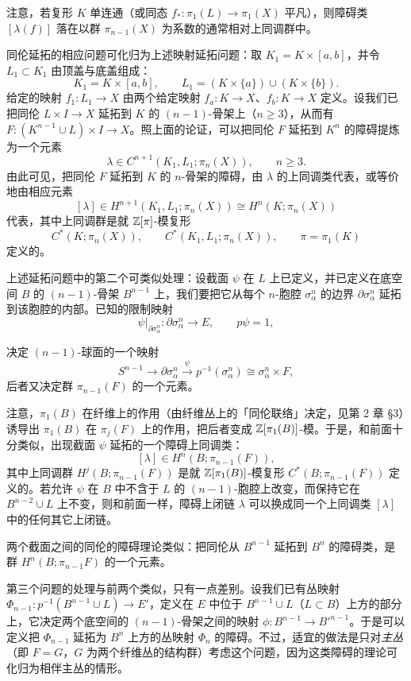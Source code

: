 注意，若复形 $K$ 单连通（或同态 $f_*:\pi_1(L)\to\pi_1(X)$ 平凡），则障碍类 $[\lambda(f)]$ 落在以群 $\pi_{n-1}(X)$ 为系数的通常相对上同调群中。

同伦延拓的相应问题可化归为上述映射延拓问题：取 $K_1=K\times[a,b]$，并令 $L_1\subset K_1$ 由顶盖与底盖组成：
\[
K_1=K\times[a,b],\qquad L_1=(K\times\{a\})\cup(K\times\{b\}).
\]
给定的映射 $f_1:L_1\to X$ 由两个给定映射 $f_a:K\to X$、$f_b:K\to X$ 定义。设我们已把同伦 $L\times I\to X$ 延拓到 $K$ 的 $(n-1)$-骨架上（$n\ge 3$），从而有 $F:(K^{n-1}\cup L)\times I\to X$。照上面的论证，可以把同伦 $F$ 延拓到 $K^n$ 的障碍提炼为一个元素
\[
\lambda\in C^{n+1}(K_1,L_1;\pi_n(X)),\qquad n\ge 3.
\]
由此可见，把同伦 $F$ 延拓到 $K$ 的 $n$-骨架的障碍，由 $\lambda$ 的上同调类代表，或等价地由相应元素
\[
[\lambda]\in H^{n+1}(K_1,L_1;\pi_n(X))\cong H^n(K;\pi_n(X))
\]
代表，其中上同调群是就 $\mathbb{Z}[\pi]$-模复形
\[
C^*(K;\pi_n(X)),\qquad C^*(K_1,L_1;\pi_n(X)),\qquad \pi=\pi_1(K)
\]
定义的。

上述延拓问题中的第二个可类似处理：设截面 $\psi$ 在 $L$ 上已定义，并已定义在底空间 $B$ 的 $(n-1)$-骨架 $B^{n-1}$ 上，我们要把它从每个 $n$-胞腔 $\sigma^n_\alpha$ 的边界 $\partial\sigma^n_\alpha$ 延拓到该胞腔的内部。已知的限制映射
\[
\psi|_{\partial\sigma^n_\alpha}:\partial\sigma^n_\alpha\longrightarrow E,\qquad p\psi=1,
\]

决定 $(n-1)$-球面的一个映射
\[
S^{n-1}\longrightarrow\partial\sigma^n_\alpha\xrightarrow{\ \psi\ }p^{-1}(\sigma^n_\alpha)\cong\sigma^n_\alpha\times F,
\]
后者又决定群 $\pi_{n-1}(F)$ 的一个元素。

注意，$\pi_1(B)$ 在纤维上的作用（由纤维丛上的「同伦联络」决定，见第 2 章 §3）诱导出 $\pi_1(B)$ 在 $\pi_j(F)$ 上的作用，把后者变成 $\mathbb{Z}[\pi_1(B)]$-模。于是，和前面十分类似，出现截面 $\psi$ 延拓的一个障碍上同调类：
\[
[\lambda]\in H^n(B;\pi_{n-1}(F)),
\]
其中上同调群 $H^j(B;\pi_{n-1}(F))$ 是就 $\mathbb{Z}[\pi_1(B)]$-模复形 $C^*(B;\pi_{n-1}(F))$ 定义的。若允许 $\psi$ 在 $B$ 中不含于 $L$ 的 $(n-1)$-胞腔上改变，而保持它在 $B^{n-2}\cup L$ 上不变，则和前面一样，障碍上闭链 $\lambda$ 可以换成同一个上同调类 $[\lambda]$ 中的任何其它上闭链。

两个截面之间的同伦的障碍理论类似：把同伦从 $B^{n-1}$ 延拓到 $B^n$ 的障碍类，是群 $H^n(B;\pi_{n-1}F)$ 的一个元素。

第三个问题的处理与前两个类似，只有一点差别。设我们已有丛映射 $\Phi_{n-1}:p^{-1}(B^{n-1}\cup L)\to E'$，定义在 $E$ 中位于 $B^{n-1}\cup L$（$L\subset B$）上方的部分上，它决定两个底空间的 $(n-1)$-骨架之间的映射 $\phi:B^{n-1}\to B'^{n-1}$。于是可以定义把 $\Phi_{n-1}$ 延拓为 $B^n$ 上方的丛映射 $\Phi_n$ 的障碍。不过，适宜的做法是只对\emph{主丛}（即 $F=G$，$G$ 为两个纤维丛的结构群）考虑这个问题，因为这类障碍的理论可化归为相伴主丛的情形。

